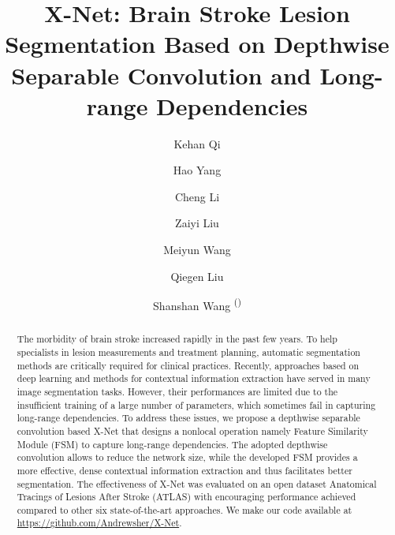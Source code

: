 \documentclass[runningheads]{llncs}
\begin{document}
\title{X-Net: Brain Stroke Lesion Segmentation Based on Depthwise Separable Convolution and Long-range Dependencies}


\renewcommand{\thefootnote}{\fnsymbol{footnote}} 

\author{Kehan Qi  \and
	Hao Yang   \and
	Cheng Li  \and
	Zaiyi Liu  \and
	Meiyun Wang  \and
	Qiegen Liu  \and
	Shanshan Wang \textsuperscript{(\Letter)}}



\maketitle              \begin{abstract}
The morbidity of brain stroke increased rapidly in the past few years. To help specialists in lesion measurements and treatment planning, automatic segmentation methods are critically required for clinical practices. Recently, approaches based on deep learning and methods for contextual information extraction have served in many image segmentation tasks. However, their performances are limited due to the insufficient training of a large number of parameters, which sometimes fail in capturing long-range dependencies. To address these issues, we propose a depthwise separable convolution based X-Net that designs a nonlocal operation namely Feature Similarity Module (FSM) to capture long-range dependencies. The adopted depthwise convolution allows to reduce the network size, while the developed FSM provides a more effective, dense contextual information extraction and thus facilitates better segmentation. The effectiveness of X-Net was evaluated on an open dataset Anatomical Tracings of Lesions After Stroke (ATLAS) with encouraging performance achieved compared to other six state-of-the-art approaches.  We make our code available at \url{https://github.com/Andrewsher/X-Net}.
 
\end{abstract}
\end{document}
